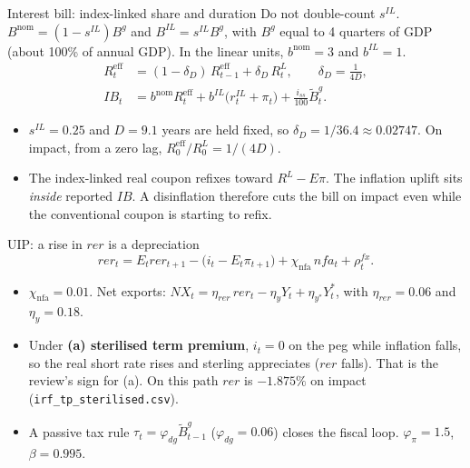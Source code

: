 \documentclass[11pt,aspectratio=169]{beamer}
\begin{document}
\begin{frame}{Interest bill: index-linked share and duration}
  Do not double-count $s^{IL}$.
  $B^{\mathrm{nom}}=(1-s^{IL})B^{g}$ and $B^{IL}=s^{IL}B^{g}$,
  with $B^{g}$ equal to 4 quarters of GDP
  (about 100\% of annual GDP).
  In the linear units, $b^{\mathrm{nom}}=3$ and $b^{IL}=1$.
  \begin{align*}
    R^{\mathrm{eff}}_{t}
      &= (1-\delta_{D})\, R^{\mathrm{eff}}_{t-1} + \delta_{D}\, R^{L}_{t},
      \qquad \delta_{D}=\frac{1}{4D}, \\[0.2em]
    IB_{t}
      &= b^{\mathrm{nom}} R^{\mathrm{eff}}_{t}
       + b^{IL}\bigl(r^{IL}_{t}+\pi_{t}\bigr)
       + \frac{i_{ss}}{100}\widetilde{B}^{g}_{t}.
  \end{align*}
  \begin{itemize}
    \item $s^{IL}=0.25$ and $D=9.1$ years are held fixed, so
          $\delta_{D}=1/36.4\approx 0.02747$.
          On impact, from a zero lag,
          $R^{\mathrm{eff}}_{0}/R^{L}_{0}=1/(4D)$.
    \item The index-linked real coupon refixes toward $R^{L}-E\pi$.
          The inflation uplift sits \emph{inside} reported $IB$.
          A disinflation therefore cuts the bill on impact even while
          the conventional coupon is starting to refix.
  \end{itemize}
\end{frame}

\begin{frame}{UIP: a rise in $rer$ is a depreciation}
  \begin{equation*}
    rer_{t}
      = E_{t} rer_{t+1}
      - \bigl(i_{t}-E_{t}\pi_{t+1}\bigr)
      + \chi_{\mathrm{nfa}}\, nfa_{t}
      + \rho^{fx}_{t}.
  \end{equation*}
  \begin{itemize}
    \item $\chi_{\mathrm{nfa}}=0.01$. Net exports:
          $NX_{t}=\eta_{rer}\, rer_{t}-\eta_{y} Y_{t}+\eta_{y^{\ast}} Y^{\ast}_{t}$,
          with $\eta_{rer}=0.06$ and $\eta_{y}=0.18$.
    \item Under \textbf{(a) sterilised term premium}, $i_{t}=0$ on the peg
          while inflation falls, so the real short rate rises and
          sterling appreciates ($rer$ falls). That is the review's sign
          for (a). On this path $rer$ is $-1.875\%$ on impact
          (\texttt{irf\_tp\_sterilised.csv}).
    \item A passive tax rule $\tau_{t}=\varphi_{dg}\widetilde{B}^{g}_{t-1}$
          ($\varphi_{dg}=0.06$) closes the fiscal loop.
          $\varphi_{\pi}=1.5$, $\beta=0.995$.
  \end{itemize}
\end{frame}
\end{document}
